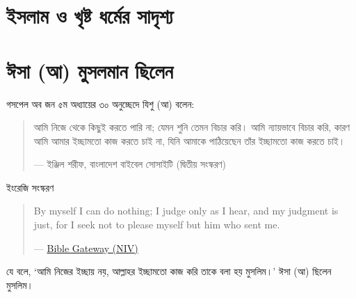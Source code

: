 \documentclass[
]{book}
\begin{document}
\hypertarget{similarities-between-islam-and-christianity}{%
\section*{ইসলাম ও খৃষ্ট ধর্মের সাদৃশ্য}\label{similarities-between-islam-and-christianity}}

\hypertarget{jesus-muslim}{%
\section*{ঈসা (আ) মুসলমান ছিলেন}\label{jesus-muslim}}

গসপেল অব জন ৫ম অধ্যায়ের ৩০ অনুচ্ছেদে যিশু (আ) বলেন:

\begin{quote}
আমি নিজে থেকে কিছুই করতে পারি না; যেমন শুনি তেমন বিচার করি। আমি ন্যায়ভাবে বিচার করি, কারণ আমি আমার ইচ্ছামতো কাজ করতে চাই না, যিনি আমাকে পাঠিয়েছেন তাঁর ইচ্ছামতো কাজ করতে চাই।

--- ইঞ্জিল শরীফ, বাংলাদেশ বাইবেল সোসাইটি (দ্বিতীয় সংস্করণ)
\end{quote}

ইংরেজি সংস্করণ

\begin{quote}
By myself I can do nothing; I judge only as I hear, and my judgment is just, for I seek not to please myself but him who sent me.

--- \href{https://www.biblegateway.com/passage/?search=John+5\&version=NIV}{Bible Gateway (NIV)}
\end{quote}

যে বলে, `আমি নিজের ইচ্ছায় নয়, আল্লাহর ইচ্ছামতো কাজ করি তাকে বলা হয় মুসলিম।' ঈসা (আ) ছিলেন মুসলিম।
\end{document}
